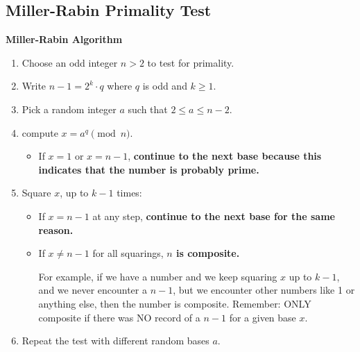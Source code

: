 \subsection{Miller-Rabin Primality Test}
\label{sec:Miller-Rabin}


\begin{center}
    \textbf{Miller-Rabin Algorithm }    
\end{center}

\begin{enumerate}
    \item Choose an odd integer \(n > 2\) to test for primality.
    \item Write \(n - 1 = 2^k \cdot q\) where \(q\) is odd and \(k \geq 1\). 
    \item Pick a random integer \(a\) such that \(2 \leq a \leq n - 2\).
    \item compute \(x = a^q \pmod{n}\).
    \begin{itemize}
        \item If \(x = 1\) or \(x = n - 1\), \textbf{continue to the next base because this indicates that the number is probably prime.}
    \end{itemize}
    \item Square \(x\), up to \(k - 1\) times:
    \begin{itemize}
        \item If \(x = n - 1\) at any step, \textbf{continue to the next base for the same reason.}
        \item If \(x \ne n - 1\) for all squarings, \textbf{\(n\) is composite.}
        
        For example, if we have a number and we keep squaring \(x\) up to \(k - 1\), and we never encounter a \(n - 1\), but we encounter other numbers like 1 or anything else, then the number is composite. Remember: ONLY composite if there was NO record of a \(n - 1\) for a given base \(x\).
    \end{itemize}
    \item Repeat the test with different random bases \(a\).
\end{enumerate}

